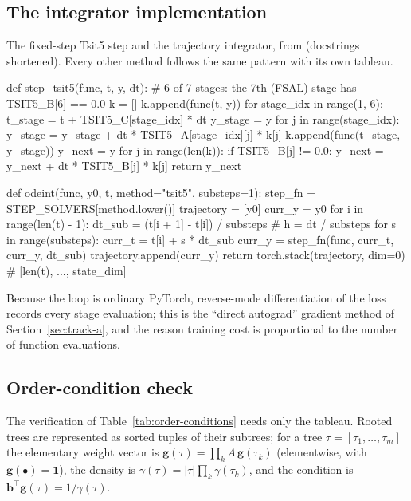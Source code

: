 \subsection{The integrator implementation}

The fixed-step Tsit5 step and the trajectory integrator, from
 (docstrings shortened). Every other
method follows the same pattern with its own tableau.

\begin{pycode}
def step_tsit5(func, t, y, dt):
    # 6 of 7 stages: the 7th (FSAL) stage has TSIT5_B[6] == 0.0
    k = []
    k.append(func(t, y))
    for stage_idx in range(1, 6):
        t_stage = t + TSIT5_C[stage_idx] * dt
        y_stage = y
        for j in range(stage_idx):
            y_stage = y_stage + dt * TSIT5_A[stage_idx][j] * k[j]
        k.append(func(t_stage, y_stage))
    y_next = y
    for j in range(len(k)):
        if TSIT5_B[j] != 0.0:
            y_next = y_next + dt * TSIT5_B[j] * k[j]
    return y_next
\end{pycode}

\begin{pycode}
def odeint(func, y0, t, method="tsit5", substeps=1):
    step_fn = STEP_SOLVERS[method.lower()]
    trajectory = [y0]
    curr_y = y0
    for i in range(len(t) - 1):
        dt_sub = (t[i + 1] - t[i]) / substeps          # h = dt / substeps
        for s in range(substeps):
            curr_t = t[i] + s * dt_sub
            curr_y = step_fn(func, curr_t, curr_y, dt_sub)
        trajectory.append(curr_y)
    return torch.stack(trajectory, dim=0)           # [len(t), ..., state_dim]
\end{pycode}

Because the loop is ordinary PyTorch, reverse-mode differentiation of the loss
records every stage evaluation; this is the ``direct autograd'' gradient
method of Section~\ref{sec:track-a}, and the reason training cost is
proportional to the number of function evaluations.

\subsection{Order-condition check}

The verification of Table~\ref{tab:order-conditions} needs only the
tableau. Rooted trees are represented as sorted tuples of their subtrees;
for a tree $\tau=[\tau_1,\dots,\tau_m]$ the elementary weight vector is
$\mathbf{g}(\tau)=\prod_k A\,\mathbf{g}(\tau_k)$ (elementwise, with
$\mathbf{g}(\bullet)=\mathbf{1}$), the density is
$\gamma(\tau)=|\tau|\prod_k\gamma(\tau_k)$, and the condition is
$\mathbf{b}^\top\mathbf{g}(\tau)=1/\gamma(\tau)$.

